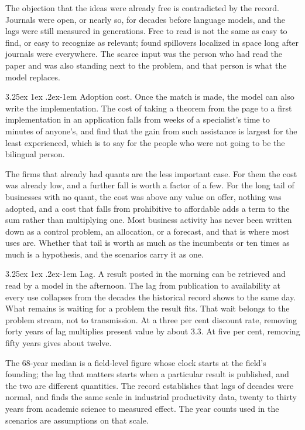 \documentclass[11pt]{article}
\makeatletter
\renewcommand\paragraph{\@startsection{paragraph}{4}{\z@}%
  {3.25ex \@plus1ex \@minus.2ex}{-1em}%
  {\normalfont\normalsize\itshape}}
\theoremstyle{definition}
\theoremstyle{remark}
\makeatother
\begin{document}
The objection that the ideas were already free is contradicted by the record. Journals were open, or nearly so, for decades before language models, and the lags were still measured in generations. Free to read is not the same as easy to find, or easy to recognize as relevant; \citet{jaffe1993} found spillovers localized in space long after journals were everywhere. The scarce input was the person who had read the paper and was also standing next to the problem, and that person is what the model replaces.

\paragraph{Adoption cost.} Once the match is made, the model can also write the implementation. The cost of taking a theorem from the page to a first implementation in an application falls from weeks of a specialist's time to minutes of anyone's, and \citet{brynjolfsson2025} find that the gain from such assistance is largest for the least experienced, which is to say for the people who were not going to be the bilingual person.

The firms that already had quants are the less important case. For them the cost was already low, and a further fall is worth a factor of a few. For the long tail of businesses with no quant, the cost was above any value on offer, nothing was adopted, and a cost that falls from prohibitive to affordable adds a term to the sum rather than multiplying one. Most business activity has never been written down as a control problem, an allocation, or a forecast, and that is where most uses are. Whether that tail is worth as much as the incumbents or ten times as much is a hypothesis, and the scenarios carry it as one.

\paragraph{Lag.} A result posted in the morning can be retrieved and read by a model in the afternoon. The lag from publication to availability at every use collapses from the decades the historical record shows to the same day. What remains is waiting for a problem the result fits. That wait belongs to the problem stream, not to transmission. At a three per cent discount rate, removing forty years of lag multiplies present value by about 3.3. At five per cent, removing fifty years gives about twelve.

The 68-year median is a field-level figure whose clock starts at the field's founding; the lag that matters starts when a particular result is published, and the two are different quantities. The record establishes that lags of decades were normal, and \citet{adams1990} finds the same scale in industrial productivity data, twenty to thirty years from academic science to measured effect. The year counts used in the scenarios are assumptions on that scale.
\end{document}
